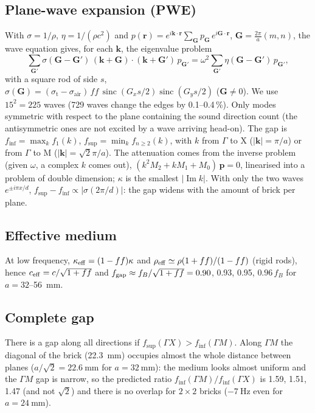 \documentclass[9pt,a4paper,twocolumn]{extarticle}
\newcommand{\umm}{\milli\metre}
\newcommand{\GX}{\ensuremath{\Gamma X}}
\newcommand{\GM}{\ensuremath{\Gamma M}}
\newcommand{\finf}{\ensuremath{f_{\mathrm{inf}}}}
\newcommand{\fsup}{\ensuremath{f_{\mathrm{sup}}}}
\begin{document}
\subsection*{Plane-wave expansion (PWE)}
With $\sigma = 1/\rho$, $\eta = 1/(\rho c^2)$ and $p(\mathbf r) = e^{i\mathbf k\cdot\mathbf r}\sum_{\mathbf G} p_{\mathbf G}\, e^{i\mathbf G\cdot\mathbf r}$, $\mathbf G = \tfrac{2\pi}{a}(m,n)$, the wave equation gives, for each $\mathbf k$, the eigenvalue problem
\begin{equation*}
  \sum_{\mathbf G'}\sigma(\mathbf G-\mathbf G')\,(\mathbf k+\mathbf G)\cdot(\mathbf k+\mathbf G')\,p_{\mathbf G'}
  = \omega^2\sum_{\mathbf G'}\eta(\mathbf G-\mathbf G')\,p_{\mathbf G'},
\end{equation*}
with a square rod of side $s$, $\sigma(\mathbf G) = (\sigma_\text{t}-\sigma_\text{air})\,f\!f\,\operatorname{sinc}(G_xs/2)\operatorname{sinc}(G_ys/2)$ ($\mathbf G \neq 0$). We use $15^2 = 225$ waves (729 waves change the edges by 0.1--0.4\,\%). Only modes symmetric with respect to the plane containing the sound direction count (the antisymmetric ones are not excited by a wave arriving head-on). The gap is $f_\text{inf} = \max_k f_1(k)$, $f_\text{sup} = \min_k f_{n\ge2}(k)$, with $k$ from $\Gamma$ to X ($|\mathbf k| = \pi/a$) or from $\Gamma$ to M ($|\mathbf k| = \sqrt{2}\pi/a$). The attenuation comes from the inverse problem (given $\omega$, a complex $k$ comes out), $(k^2 M_2 + k M_1 + M_0)\,\mathbf p = 0$, linearised into a problem of double dimension; $\kappa$ is the smallest $|\operatorname{Im} k|$. With only the two waves $e^{\pm i\pi x/d}$, $f_\text{sup} - f_\text{inf} \propto |\sigma(2\pi/d)|$: the gap widens with the amount of brick per plane.

\subsection*{Effective medium}
At low frequency, $\kappa_{\rm eff}=(1-ff)\kappa$ and $\rho_{\rm eff}\simeq\rho(1+ff)/(1-ff)$ (rigid rods), hence $c_{\rm eff}=c/\sqrt{1+ff}$ and $f_{\rm gap}\approx f_B/\sqrt{1+ff}=0.90$, 0.93, 0.95, $0.96\,f_B$ for $a=32$--\SI{56}{\milli\meter}.

\subsection*{Complete gap}
There is a gap along all directions if $\fsup(\GX)>\finf(\GM)$. Along \GM{} the diagonal of the brick (\SI{22.3}{\milli\meter}) occupies almost the whole distance between planes ($a/\sqrt2=\SI{22.6}{\umm}$ for $a=\SI{32}{\milli\meter}$): the medium looks almost uniform and the \GM{} gap is narrow, so the predicted ratio $\finf(\GM)/\finf(\GX)$ is 1.59, 1.51, 1.47 (and not $\sqrt2$) and there is no overlap for $2\times2$ bricks ($-\SI{7}{\hertz}$ even for $a=\SI{24}{\milli\meter}$).
\end{document}
